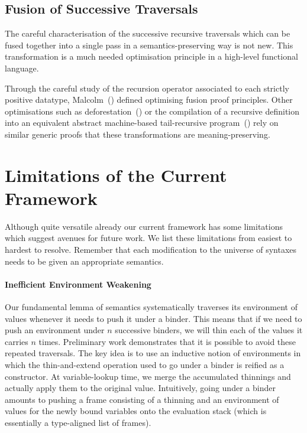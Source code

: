 \subsection{Fusion of Successive Traversals}

The careful characterisation of the successive recursive traversals which can be
fused together into a single pass in a semantics-preserving way is not new. This
transformation is a much needed optimisation principle in a high-level
functional language.

Through the careful study of the recursion operator associated to each
strictly positive datatype,
Malcolm~(\citeyear{DBLP:journals/scp/Malcolm90}) defined optimising
fusion proof principles.
%
Other optimisations such as deforestation~(\cite{DBLP:journals/tcs/Wadler90})
or the compilation of a recursive definition into an equivalent abstract
machine-based tail-recursive program~(\cite{DBLP:conf/icfp/CortinasS18})
rely on similar generic proofs that these transformations are
meaning-preserving.


\section{Limitations of the Current Framework}


Although quite versatile already our current framework has some limitations
which suggest avenues for future work. We list these limitations from easiest
to hardest to resolve. Remember that each modification to the universe of
syntaxes needs to be given an appropriate semantics.

\paragraph{Inefficient Environment Weakening} Our fundamental lemma of
semantics systematically traverses its environment of values whenever it
needs to push it under a binder. This means that if we need to push an
environment under $n$ successive binders, we will thin each of the values
it carries $n$ times.
%
Preliminary work demonstrates that it is possible to avoid these repeated
traversals. The key idea is to use an inductive notion of environments in
which the thin-and-extend operation used to go under a binder is reified
as a constructor. At variable-lookup time, we merge the accumulated
thinnings and actually apply them to the original value.
%
Intuitively, going under a binder amounts to pushing a frame consisting of
a thinning and an environment of values for the newly bound variables onto
the evaluation stack (which is essentially a type-aligned list of frames).


